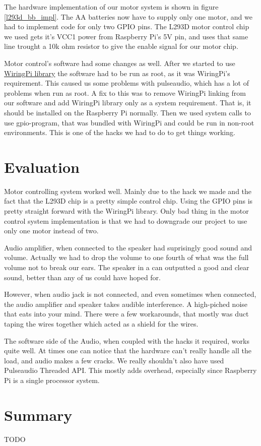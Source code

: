 \documentclass[english,11pt,twoside,a4paper]{article}
\begin{document}
The hardware implementation of our motor system is shown in figure \ref{l293d_bb_impl}. The AA batteries now have to supply only one motor, and we had to implement code for only two GPIO pins. The L293D motor control chip we used gets it's VCC1 power from Raspberry Pi's 5V pin, and uses that same line trought a 10k ohm resistor to give the enable signal for our motor chip.

Motor control's software had some changes as well. After we started to use \href{http://wiringpi.com}{WiringPi library} the software had to be run as root, as it was WiringPi's requirement. This caused us some problems with pulseaudio, which has a lot of problems when run as root. A fix to this was to remove WiringPi linking from our software and add WiringPi library only as a system requirement. That is, it should be installed on the Raspberry Pi normally. Then we used system calls to use gpio-program, that was bundled with WiringPi and could be run in non-root environments. This is one of the hacks we had to do to get things working.

\section{Evaluation}

Motor controlling system worked well. Mainly due to the hack we made and the fact that the L293D chip is a pretty simple control chip. Using the GPIO pins is pretty straight forward with the WiringPi library. Only bad thing in the motor control system implementation is that we had to downgrade our project to use only one motor instead of two.

Audio amplifier, when connected to the speaker had suprisingly good sound and volume. Actually we had to drop the volume to one fourth of what was the full volume not to break our ears. The speaker in a can outputted a good and clear sound, better than any of us could have hoped for.

However, when audio jack is not connected, and even sometimes when connected, the audio amplifier and speaker takes audible interference. A high-piched noise that eats into your mind. There were a few workarounds, that mostly was duct taping the wires together which acted as a shield for the wires.

The software side of the Audio, when coupled with the hacks it required, works quite well. At times one can notice that the hardware can't really handle all the load, and audio makes a few cracks. We really shouldn't also have used Pulseaudio Threaded API. This mostly adds overhead, especially since Raspberry Pi is a single processor system.

\section{Summary}

TODO
\end{document}
